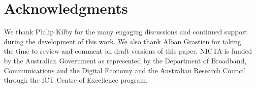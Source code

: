 \section{Acknowledgments}
We thank Philip Kilby for the many engaging discussions and continued support during 
the development of this work.
We also thank Alban Grastien for taking the time to review and comment on draft
versions of this paper.
NICTA is funded by the Australian Government as represented by the Department of 
Broadband, Communications and the Digital Economy and the Australian Research 
Council through the ICT Centre of Excellence program.

